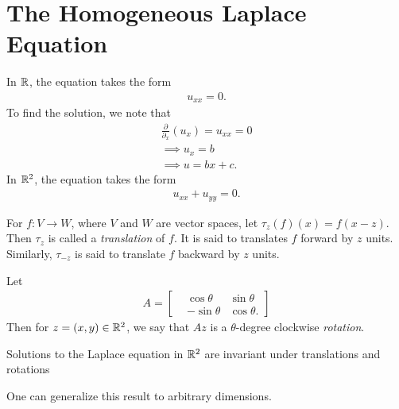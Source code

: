 \section{The Homogeneous Laplace Equation}
In $\mathbb{R}$, the equation takes the form
\begin{equation*}
\begin{split}
	u_{xx} = 0.
\end{split}
\end{equation*}
To find the solution, we note that
\begin{gather*}
	\frac{\partial}{\partial_{x}}(u_{x}) = u_{xx} = 0
	\\
	\implies u_{x} = b
	\\
	\implies u = bx + c.
\end{gather*}
In $\mathbb{R}^{2}$, the equation takes the form
\begin{equation*}
\begin{split}
	u_{xx} + u_{yy} = 0.
\end{split}
\end{equation*}
\begin{definition}
	For $f: V \to W$, where $V$ and $W$ are vector spaces, let $\tau_{z}(f)(x) = f(x-z)$. Then $\tau_{z}$ is called a \emph{translation}
	of $f$. It is said to translates $f$ forward by $z$ units. Similarly,
	$\tau_{-z}$ is said to translate $f$ backward by $z$ units.
\end{definition}

\begin{definition}
Let \begin{equation*}
\begin{split}
A = \begin{bmatrix}
& \cos \theta & \sin \theta
\\ & -\sin \theta & \cos \theta.
\end{bmatrix}
\end{split}
\end{equation*}
Then for $z = (x,y) \in \mathbb{R}^{2}$, we say that $Az$ is a $\theta$-degree
clockwise \emph{rotation}.
\end{definition}

\begin{lemma}
	Solutions to the Laplace equation in $\mathbb{R}^{2}$ are invariant under
	translations and rotations
\end{lemma}
\begin{remark}
One can generalize this result to arbitrary
dimensions.
\end{remark}

